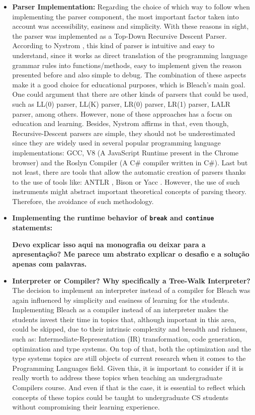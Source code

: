\begin{itemize}
\begin{itemize}
        
        \item \textbf{Parser Implementation:} Regarding the choice of which way to follow when implementing the parser component, the most important factor taken into account was accessibility, easiness and simplicity. With these reasons in sight, the parser was implemented as a Top-Down Recursive Descent Parser. According to Nystrom \cite{nystrom2021crafting}, this kind of parser is intuitive and easy to understand, since it works as direct translation of the programming language grammar rules into functions/methods, easy to implement given the reason presented before and also simple to debug. The combination of these aspects make it a good choice for educational purposes, which is Bleach's main goal. One could argument that there are other kinds of parsers that could be used, such as LL(0) parser, LL(K) parser, LR(0) parser, LR(1) parser, LALR parser, among others. However, none of these approaches has a focus on education and learning. Besides, Nystrom affirms in \cite{nystrom2021crafting} that, even though, Recursive-Descent parsers are simple, they should not be underestimated since they are widely used in several popular programming language implementations: GCC, V8 (A JavaScript Runtime present in the Chrome browser) and the Roslyn Compiler (A C\# compiler written in C\#). Last but not least, there are tools that allow the automatic creation of parsers thanks to the use of tools like: ANTLR \cite{ANTLR}, Bison \cite{Bison} or Yacc \cite{johnson1975yacc} \cite{Yacc}. However, the use of such instruments might abstract important theoretical concepts of parsing theory. Therefore, the avoidance of such methodology.

        
        \item \textbf{Implementing the runtime behavior of \texttt{break} and \texttt{continue} statements:}

        \textbf{Devo explicar isso aqui na monografia ou deixar para a apresentação? Me parece um abstrato explicar o desafio e a solução apenas com palavras.}

        
        \item \textbf{Interpreter or Compiler? Why specifically a Tree-Walk Interpreter?} The decision to implement an interpreter instead of a compiler for Bleach was again influenced by simplicity and easiness of learning for the students. Implementing Bleach as a compiler instead of an interpreter makes the students invest their time in topics that, although important in this area, could be skipped, due to their intrinsic complexity and breadth and richness, such as: Intermediate-Representation (IR) transformation, code generation, optimization and type systems. On top of that, both the optimization and the type systems topics are still objects of current research when it comes to the Programming Languages field. Given this, it is important to consider if it is really worth to address these topics when teaching an undergraduate Compilers course. And even if that is the case, it is essential to reflect which concepts of these topics could be taught to undergraduate CS students without compromising their learning experience.


\end{itemize}
\end{itemize}
